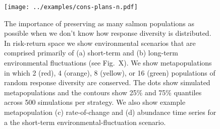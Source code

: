 \begin{figure}[htbp]
\centering
\texttt{[image: ../examples/cons-plans-n.pdf]}
\caption{The importance of preserving as many salmon populations as possible 
when we don't know how response diversity is distributed. In risk-return space 
we show environmental scenarios that are comprised primarily of (a) short-term 
and (b) long-term environmental fluctuations (see Fig.~X). We show 
metapopulations in which 2 (red), 4 (orange), 8 (yellow), or 16 (green) 
populations of random response diversity are conserved. The dots show simulated 
metapopulations and the contours show 25\% and 75\% quantiles across 500 
simulations per strategy. We also show example metapopulation (c) 
rate-of-change and (d) abundance time series for a the short-term 
environmental-fluctuation scenario.}
\label{f:n-mv}
\end{figure}

